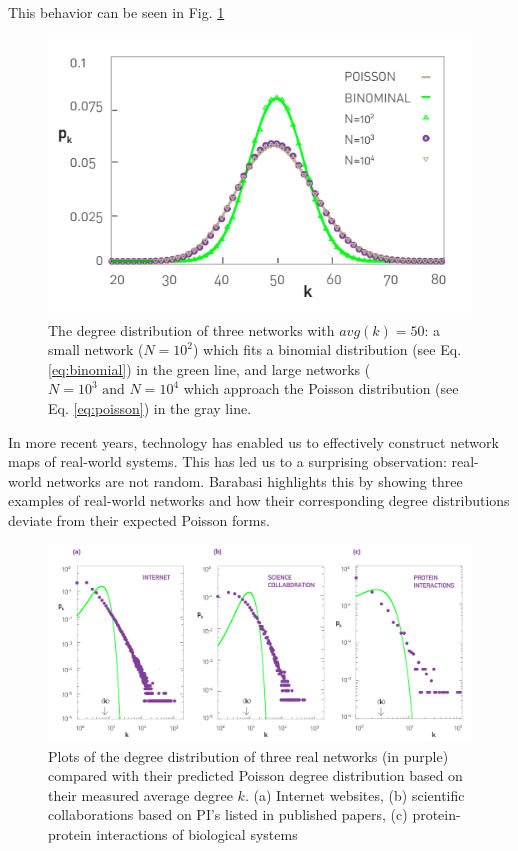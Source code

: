 \documentclass{article}
\begin{document}
This behavior can be seen in Fig. \ref{fig:binompoisson}

\begin{figure}[h]
    \center
    \includegraphics[scale=0.85]{ns-binomial}
    \caption{The degree distribution of three networks with $avg(k)=50$: a small network ($N=10^2$) which fits a binomial distribution (see Eq. \ref{eq:binomial}) in the green line, and large networks ($N = 10^3 \text{ and } N=10^4$ which approach the Poisson distribution (see Eq. \ref{eq:poisson}) in the gray line.  \cite{ns}}
    \label{fig:binompoisson}
\end{figure}

In more recent years,  technology has enabled us to effectively construct network maps of real-world systems.  This has led us to a surprising observation: real-world networks are not random. Barabasi highlights this by showing three examples of real-world networks and how their corresponding degree distributions deviate from their expected Poisson forms.


\begin{figure}[h]
    \center
    \includegraphics[scale=0.65]{ns-realnets}
    \caption{Plots of the degree distribution of three real networks (in purple) compared with their predicted Poisson degree distribution based on their measured average degree $k$. (a) Internet websites, (b) scientific collaborations based on PI's listed in published papers, (c) protein-protein interactions of biological systems \cite{ns}}
    \label{fig:realnets}
\end{figure}
\end{document}
